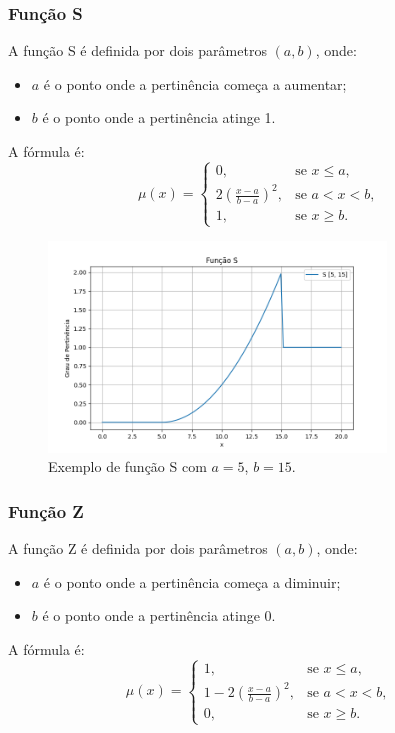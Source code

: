 \documentclass[a4paper,12pt]{article}
\begin{document}
\subsubsection{Função S}
A função S é definida por dois parâmetros $(a, b)$, onde:
\begin{itemize}
    \item $a$ é o ponto onde a pertinência começa a aumentar;
    \item $b$ é o ponto onde a pertinência atinge 1.
\end{itemize}
A fórmula é:
\[
\mu(x) =
\begin{cases}
0, & \text{se } x \leq a, \\
2\left(\frac{x - a}{b - a}\right)^2, & \text{se } a < x < b, \\
1, & \text{se } x \geq b.
\end{cases}
\]
\begin{figure}[H]
    \centering
    \includegraphics[width=0.8\textwidth]{img/s.png}
    \caption{Exemplo de função S com $a=5$, $b=15$.}
\end{figure}

\subsubsection{Função Z}
A função Z é definida por dois parâmetros $(a, b)$, onde:
\begin{itemize}
    \item $a$ é o ponto onde a pertinência começa a diminuir;
    \item $b$ é o ponto onde a pertinência atinge 0.
\end{itemize}
A fórmula é:
\[
\mu(x) =
\begin{cases}
1, & \text{se } x \leq a, \\
1 - 2\left(\frac{x - a}{b - a}\right)^2, & \text{se } a < x < b, \\
0, & \text{se } x \geq b.
\end{cases}
\]
\end{document}

